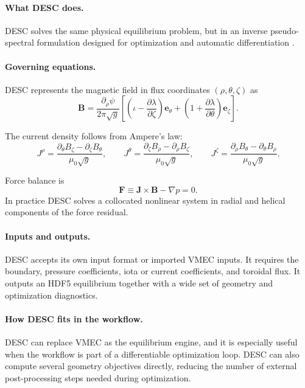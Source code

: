\documentclass[11pt]{article}
\begin{document}
\paragraph{What DESC does.}
DESC solves the same physical equilibrium problem, but in an inverse
pseudo-spectral formulation designed for optimization and automatic
differentiation \citep{DudtKolemen2020,Panici2023,Conlin2023,Dudt2023QS,DESCRepo}.

\paragraph{Governing equations.}
DESC represents the magnetic field in flux coordinates $(\rho,\theta,\zeta)$ as
\begin{equation}
\mathbf{B}
=
\frac{\partial_\rho \psi}{2\pi\sqrt{g}}
\left[
\left(\iota - \frac{\partial \lambda}{\partial \zeta}\right)\mathbf{e}_\theta
+
\left(1 + \frac{\partial \lambda}{\partial \theta}\right)\mathbf{e}_\zeta
\right].
\end{equation}

The current density follows from Ampere's law:
\begin{equation}
J^\rho = \frac{\partial_\theta B_\zeta - \partial_\zeta B_\theta}{\mu_0\sqrt{g}},
\qquad
J^\theta = \frac{\partial_\zeta B_\rho - \partial_\rho B_\zeta}{\mu_0\sqrt{g}},
\qquad
J^\zeta = \frac{\partial_\rho B_\theta - \partial_\theta B_\rho}{\mu_0\sqrt{g}}.
\end{equation}

Force balance is
\begin{equation}
\mathbf{F}\equiv\mathbf{J}\times\mathbf{B}-\nabla p = 0.
\end{equation}
In practice DESC solves a collocated nonlinear system in radial and helical
components of the force residual.

\paragraph{Inputs and outputs.}
DESC accepts its own input format or imported VMEC inputs. It requires the
boundary, pressure coefficients, iota or current coefficients, and toroidal
flux. It outputs an HDF5 equilibrium together with a wide set of geometry and
optimization diagnostics.

\paragraph{How DESC fits in the workflow.}
DESC can replace VMEC as the equilibrium engine, and it is especially useful
when the workflow is part of a differentiable optimization loop. DESC can also
compute several geometry objectives directly, reducing the number of external
post-processing steps needed during optimization.
\end{document}
